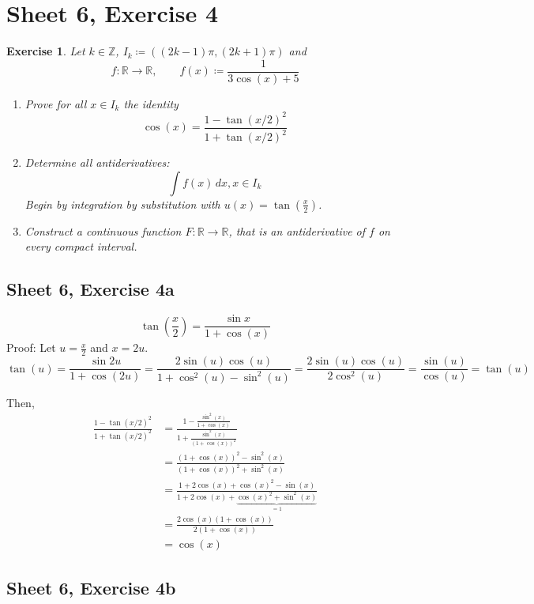 \documentclass{article}
\newtheorem{ex}{Exercise} %
\begin{document}
\section{Sheet 6, Exercise 4}
\begin{ex}
  Let $k \in \mathbb Z$, $I_k \coloneqq ((2k - 1) \pi, (2k + 1)\pi)$ and
  \[ f: \mathbb R \to \mathbb R, \qquad f(x) \coloneqq \frac{1}{3\cos(x) + 5} \]
  \begin{enumerate}
    \item Prove for all $x \in I_k$ the identity
      \[ \cos(x) = \frac{1 - \tan(x/2)^2}{1 + \tan(x/2)^2} \]
    \item Determine all antiderivatives:
      \[ \int f(x) \, dx, x \in I_k \]
      Begin by integration by substitution with $u(x) = \tan(\frac x2)$.
    \item Construct a continuous function $F: \mathbb R \to \mathbb R$,
      that is an antiderivative of $f$ on every compact interval.
  \end{enumerate}
\end{ex}

\subsection{Sheet 6, Exercise 4a}

\[ \tan\left(\frac x2\right) = \frac{\sin x}{1 + \cos(x)} \]
Proof:
Let $u = \frac x2$ and $x = 2u$.
\[ \tan(u) = \frac{\sin{2u}}{1 + \cos(2u)} = \frac{2 \sin(u) \cos(u)}{1 + \cos^2(u) - \sin^2(u)} = \frac{2 \sin(u) \cos(u)}{2 \cos^2(u)} = \frac{\sin(u)}{\cos(u)} = \tan(u) \]

Then,
\begin{align*}
  \frac{1 - \tan(x/2)^2}{1 + \tan(x/2)^2}
    &= \frac{1 - \frac{\sin^2(x)}{1 + \cos(x)}}{1 + \frac{\sin^2(x)}{(1 + \cos(x))^2}} \\
    &= \frac{(1 + \cos(x))^2 - \sin^2(x)}{(1 + \cos(x))^2 + \sin^2(x)} \\
    &= \frac{1 + 2\cos(x) + \cos(x)^2 - \sin(x)}{1 + 2\cos(x) + \underbrace{\cos(x)^2 + \sin^2(x)}_{=1}} \\
    &= \frac{2 \cos(x) (1 + \cos(x))}{2(1 + \cos(x))} \\
    &= \cos(x)
\end{align*}

\subsection{Sheet 6, Exercise 4b}
\end{document}
